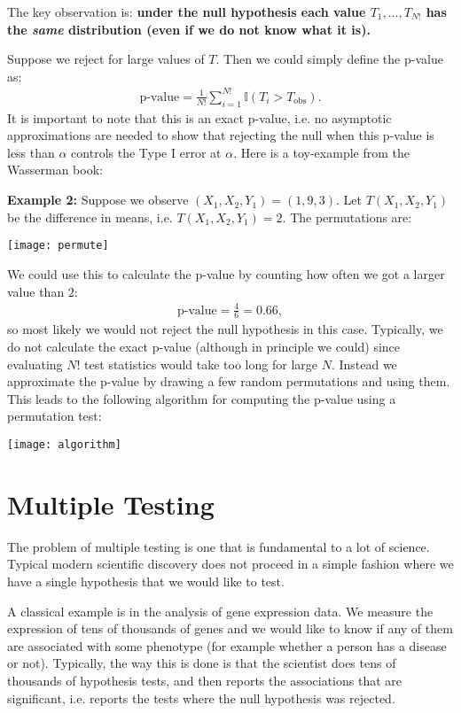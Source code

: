 \documentclass[twoside,12pt]{article}
\begin{document}
The key observation is: {\bf under the null hypothesis each value $T_1,\ldots,T_{N!}$ has the \emph{same} distribution (even if we do not know what it is).}

Suppose we reject for large values of $T$. Then we could simply define the p-value as:
\begin{align*}
\text{p-value} = \frac{1}{N!} \sum_{i=1}^{N!}  \mathbb{I}(T_i > T_{\mathrm{obs}}).
\end{align*}
It is important to note that this is an exact p-value, i.e. no asymptotic approximations are needed to 
show that rejecting the null when this p-value is less than $\alpha$ controls the Type I error at $\alpha$.
Here is a toy-example from the Wasserman book:

{\bf Example 2: } Suppose we observe $(X_1,X_2,Y_1) = (1,9,3).$ Let $T(X_1,X_2,Y_1)$ be the difference in means, i.e. $T(X_1,X_2,Y_1) = 2.$ The permutations are:

\begin{center}
\texttt{[image: permute]}
\end{center}

We could use this to calculate the p-value by counting how often we got a larger value than $2$:
\begin{align*}
\text{p-value} = \frac{4}{6} = 0.66, 
\end{align*}
so most likely we would not reject the null hypothesis in this case.
Typically, we do not calculate the exact p-value (although in principle we could) since evaluating $N!$
test statistics would take too long for large $N$. Instead we approximate the p-value by drawing a few random permutations and using them. This leads to the following algorithm for computing the p-value
using a permutation test:

\begin{center}
\texttt{[image: algorithm]}
\end{center}

\section{Multiple Testing} 
The problem of multiple testing is one that is fundamental to a lot of science. 
Typical modern scientific discovery does not proceed in a simple fashion where we have a single hypothesis that we would like to test. 

A classical example is in the analysis of gene expression data. We measure the expression of tens of thousands of genes and we would like to know if any of them are associated with some phenotype (for example whether a person has a disease or not). Typically, the way this is done is that the scientist
does tens of thousands of hypothesis tests, and then reports the associations that are significant, i.e. reports the tests where the null hypothesis was rejected. 
\end{document}
